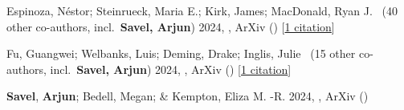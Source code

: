 \item[{\color{numcolor}\scriptsize3}] Espinoza, N{\'e}stor; Steinrueck, Maria E.; Kirk, James; MacDonald, Ryan J. \etal\ ({40} other co-authors, incl.\ \textbf{Savel, Arjun}) 2024, , ArXiv () [\href{https://ui.adsabs.harvard.edu/abs/2024arXiv240710294E}{1 citation}]

\item[{\color{numcolor}\scriptsize2}] Fu, Guangwei; Welbanks, Luis; Deming, Drake; Inglis, Julie \etal\ ({15} other co-authors, incl.\ \textbf{Savel, Arjun}) 2024, , ArXiv () [\href{https://ui.adsabs.harvard.edu/abs/2024arXiv240706163F}{1 citation}]

\item[{\color{numcolor}\scriptsize1}] \textbf{Savel}, \textbf{Arjun}; Bedell, Megan; \& Kempton, Eliza M. -R. 2024, , ArXiv ()